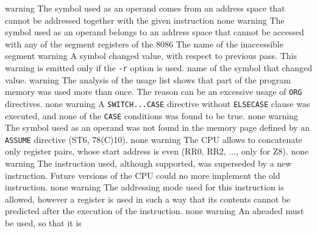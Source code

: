 \documentclass[12pt,twoside]{report}
\newcommand{\tty}[1]{{\tt #1}}
\begin{document}
\begin{description}
               {warning}
               {The symbol used as an operand comes from an address space
                that cannot be addressed together with the given instruction}
               {none}
               {warning}
               {The symbol used as an operand belongs to an address space
                that cannot be accessed with any of the segment registers of
                the 8086}
               {The name of the inaccessible segment}
               {warning}
               {A symbol changed value, with respect to previous pass. This
                warning is emitted only if the \tty{-r} option is used.}
               {name of the symbol that changed value.}
               {warning}
               {The analysis of the usage list shows that part of the
                program memory was used more than once. The reason can be an
                excessive usage of \tty{ORG} directives.}
               {none}
               {warning}
               {A \tty{SWITCH...CASE} directive without \tty{ELSECASE} clause was
                executed, and none of the \tty{CASE} conditions was found
                to be true.}
               {none}
               {warning}
               {The symbol used as an operand was not found in the memory
                page defined by an \tty{ASSUME} directive (ST6, 78(C)10).}
               {none}
               {warning}
               {The CPU allows to concatenate only register pairs, whose
                start address is even (RR0, RR2, ..., only for Z8).}
               {none}
               {warning}
               {The instruction used, although supported, was superseded by
                a new instruction. Future versions of the CPU could no more
                implement the old instruction.}
               {none}
               {warning}
               {The addressing mode used for this instruction is allowed,
                however a register is used in such a way that its contents
                cannot be predicted after the execution of the
                instruction.}
               {none}
               {warning}
               {An aheaded \@ must be used, so that it is
}
\end{description}
\end{document}
